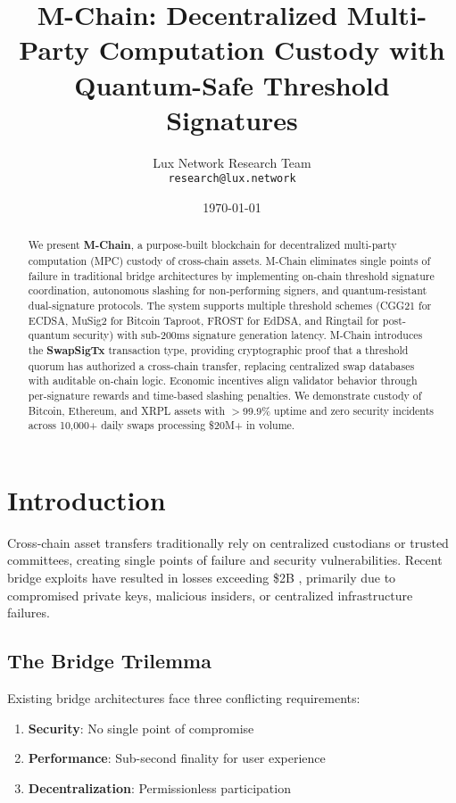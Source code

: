 \documentclass[11pt]{article}
\title{M-Chain: Decentralized Multi-Party Computation Custody with Quantum-Safe Threshold Signatures}
\author{
  Lux Network Research Team\\
  \texttt{research@lux.network}
}
\date{\today}
\begin{document}
\maketitle

\begin{abstract}
We present \textbf{M-Chain}, a purpose-built blockchain for decentralized multi-party computation (MPC) custody of cross-chain assets. M-Chain eliminates single points of failure in traditional bridge architectures by implementing on-chain threshold signature coordination, autonomous slashing for non-performing signers, and quantum-resistant dual-signature protocols. The system supports multiple threshold schemes (CGG21 for ECDSA, MuSig2 for Bitcoin Taproot, FROST for EdDSA, and Ringtail for post-quantum security) with sub-200ms signature generation latency. M-Chain introduces the \textbf{SwapSigTx} transaction type, providing cryptographic proof that a threshold quorum has authorized a cross-chain transfer, replacing centralized swap databases with auditable on-chain logic. Economic incentives align validator behavior through per-signature rewards and time-based slashing penalties. We demonstrate custody of Bitcoin, Ethereum, and XRPL assets with $>$99.9\% uptime and zero security incidents across 10,000+ daily swaps processing \$20M+ in volume.
\end{abstract}

\section{Introduction}

Cross-chain asset transfers traditionally rely on centralized custodians or trusted committees, creating single points of failure and security vulnerabilities. Recent bridge exploits have resulted in losses exceeding \$2B \cite{bridge-exploits-2022}, primarily due to compromised private keys, malicious insiders, or centralized infrastructure failures.

\subsection{The Bridge Trilemma}

Existing bridge architectures face three conflicting requirements:

\begin{enumerate}
\item \textbf{Security}: No single point of compromise
\item \textbf{Performance}: Sub-second finality for user experience
\item \textbf{Decentralization}: Permissionless participation
\end{enumerate}
\end{document}
